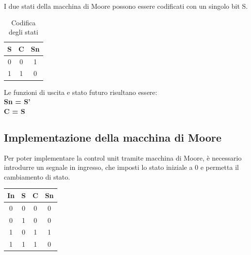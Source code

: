 \documentclass[10pt]{article}
\begin{document}
\begin{itemize}
I due stati della macchina di Moore possono essere codificati con un singolo bit S.

\begin{table}[H]
    \begin{minipage}[c]{\textwidth}
    \centering
    \begin{tabular}{|c|c|c|}
        \hline
        \textbf{S} & \textbf{C} & \textbf{Sn} \\ \hline
        0          & 0          & 1           \\ 
        1          & 1          & 0           \\ \hline
        \end{tabular}
        \caption{Codifica degli stati}
        \label{tab:my-table}
    \end{minipage}
    \end{table}

Le funzioni di uscita e stato futuro risultano essere:\\
\textbf{Sn = S'}\\
\textbf{C = S}\\

\subsection{Implementazione della macchina di Moore}
Per poter implementare la control unit tramite macchina di Moore, è necessario introdurre un segnale in ingresso, che imposti lo stato iniziale a 0 e permetta il cambiamento
di stato. 
\begin{table}[H]
    \begin{minipage}[c]{\textwidth}
    \centering
    \begin{tabular}{|c|c|c|c|}
        \hline
        \textbf{In} &\textbf{S}  & \textbf{C} & \textbf{Sn} \\ \hline
        0           &0           & 0          & 0           \\
        0           &1           & 0          & 0           \\
        1           &0           & 1          & 1           \\ 
        1           &1           & 1          & 0           \\ \hline
        \end{tabular}
    \end{minipage}
    \end{table}


\end{itemize}
\end{document}
